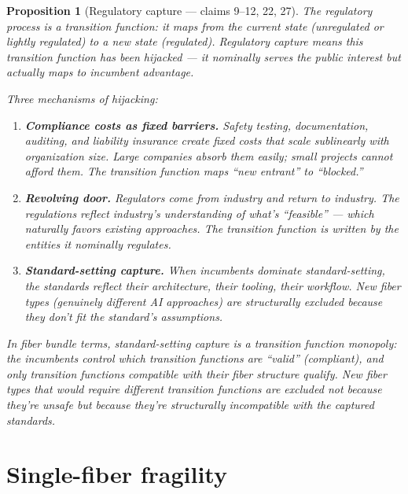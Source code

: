 \documentclass[11pt,a4paper]{article}
\newtheorem{proposition}[definition]{Proposition}
\begin{document}
\begin{proposition}[Regulatory capture --- claims 9--12, 22, 27]
\label{prop:capture-v1}
The regulatory process is a transition function: it maps from the
current state (unregulated or lightly regulated) to a new state
(regulated). Regulatory capture means this transition function has
been hijacked --- it nominally serves the public interest but
actually maps to incumbent advantage.

Three mechanisms of hijacking:
\begin{enumerate}
\item \textbf{Compliance costs as fixed barriers.} Safety testing,
  documentation, auditing, and liability insurance create fixed costs
  that scale sublinearly with organization size. Large companies
  absorb them easily; small projects cannot afford them. The
  transition function maps ``new entrant'' to ``blocked.''

\item \textbf{Revolving door.} Regulators come from industry and
  return to industry. The regulations reflect industry's understanding
  of what's ``feasible'' --- which naturally favors existing approaches.
  The transition function is written by the entities it nominally
  regulates.

\item \textbf{Standard-setting capture.} When incumbents dominate
  standard-setting, the standards reflect their architecture, their
  tooling, their workflow. New fiber types (genuinely different AI
  approaches) are structurally excluded because they don't fit the
  standard's assumptions.
\end{enumerate}

In fiber bundle terms, standard-setting capture is a \emph{transition
function monopoly}: the incumbents control which transition functions
are ``valid'' (compliant), and only transition functions compatible
with their fiber structure qualify. New fiber types that would require
different transition functions are excluded not because they're
unsafe but because they're structurally incompatible with the
captured standards.
\end{proposition}


\section{Single-fiber fragility}
\label{sec:fragility}
\end{document}
